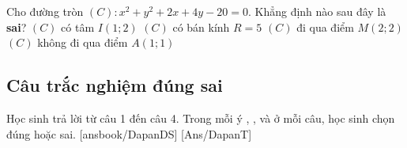 \begin{ex}%
	Cho đường tròn $(C)\colon x^2+y^2+2x+4y-20=0$. Khẳng định nào sau đây là \textbf{sai}?
	\choice
	{\True $(C)$ có tâm $I(1;2)$}
	{$(C)$ có bán kính $R=5$}
	{$(C)$ đi qua điểm $M(2;2)$}
	{$(C)$ không đi qua điểm $A(1;1)$}
\end{ex}
  

\subsection{Câu trắc nghiệm đúng sai}
Học sinh trả lời từ câu 1 đến câu 4.
Trong mỗi ý , ,  và  ở mỗi câu, học sinh chọn đúng hoặc sai.
\setcounter{ex}{0}
\LGexTF
{}[ansbook/DapanDS]
[Ans/DapanT]

